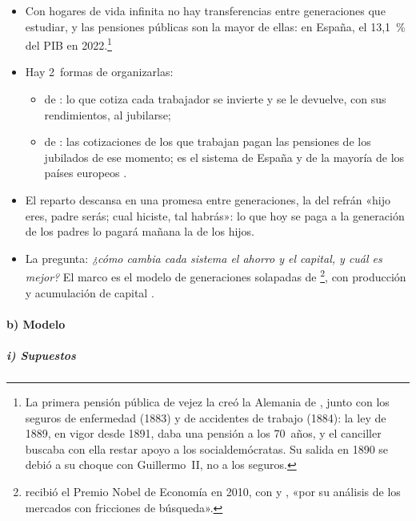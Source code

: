 \documentclass[11pt]{article}
\begin{document}
\begin{itemize}
\item Con hogares de vida infinita no hay transferencias entre generaciones que estudiar, y las pensiones públicas son la mayor de ellas: en España, el 13,1~\% del PIB en 2022\nocite{CE2024AgeingReport}.\footnote{La primera pensión pública de vejez la creó la Alemania de , junto con los seguros de enfermedad (1883) y de accidentes de trabajo (1884): la ley de 1889, en vigor desde 1891, daba una pensión a los 70~años, y el canciller buscaba con ella restar apoyo a los socialdemócratas\nocite{DRV2026Historie}. Su salida en 1890 se debió a su choque con Guillermo~II, no a los seguros.}
\item Hay 2~formas de organizarlas:
  \begin{itemize}
  \item de : lo que cotiza cada trabajador se invierte y se le devuelve, con sus rendimientos, al jubilarse;
  \item de : las cotizaciones de los que trabajan pagan las pensiones de los jubilados de ese momento; es el sistema de España y de la mayoría de los países europeos .
  \end{itemize}
\item El reparto descansa en una promesa entre generaciones, la del refrán «hijo eres, padre serás; cual hiciste, tal habrás»: lo que hoy se paga a la generación de los padres lo pagará mañana la de los hijos.
\item La pregunta: \emph{¿cómo cambia cada sistema el ahorro y el capital, y cuál es mejor?} El marco es el modelo de generaciones solapadas de \textcite{Diamond1965National}\footnote{ recibió el Premio Nobel de Economía en 2010, con  y , «por su análisis de los mercados con fricciones de búsqueda»\nocite{Nobel2010DiamondMortensenPissarides}.}, con producción y acumulación de capital .
\end{itemize}

\paragraph{b) Modelo}

\subparagraph{i) Supuestos}
\end{document}
